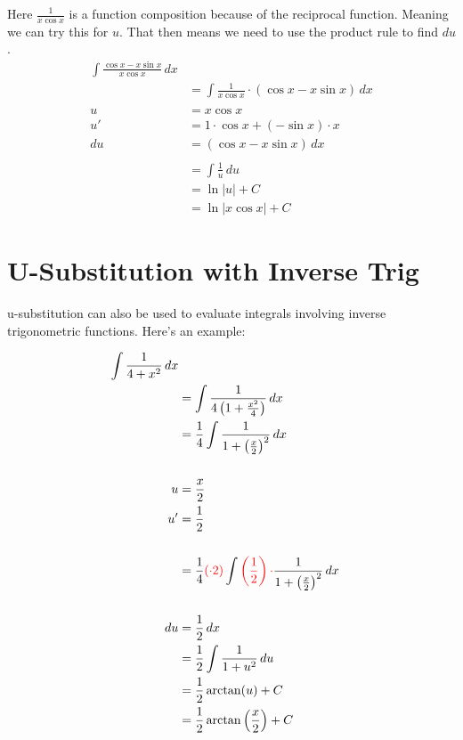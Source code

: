 \begin{framed}
  Here $\frac{1}{x \cos x}$ is a function composition because of
  the reciprocal function. Meaning we can try this for $u$. That then means
  we need to use the product rule to find $du$.
\begin{align*}
  \int \frac{\cos x - x \sin x}{x\cos x} \, dx\\
  &= \int \frac{1}{x\cos x} \cdot \left(\cos x - x\sin x\right) \, dx\\\\
  u &= x\cos x\\
  u' &= 1 \cdot \cos x + (- \sin x) \cdot x\\
  du &= \left(\cos x - x \sin x\right) \, dx\\\\
  &= \int \frac{1}{u} \, du\\
  &= \ln |u| + C\\
  &= \ln |x\cos x| + C
\end{align*}
\end{framed}


\newpage

\section{U-Substitution with Inverse Trig}
\noindent u-substitution can also be used to evaluate integrals involving 
inverse trigonometric functions. Here's an example:

\begin{framed}
  \begin{align*}
    \int \frac{1}{4+x^2} \, dx\\
    &= \int \frac{1}{4\left(1+\frac{x^2}{4}\right)} \, dx\\
    &= \frac{1}{4} \int \frac{1}{1 + \left(\frac{x}{2}\right)^2} \, dx\\\\
    u&=\frac{x}{2}\\
    u'&=\frac{1}{2}\\\\
    &= \frac{1}{4} \textcolor{red}{(\cdot 2)} \int 
    \textcolor{red}{\left(\frac{1}{2}\right) \cdot }\frac{1}{1 
    + \left(\frac{x}{2}\right)^2} \, dx\\\\
    du &= \frac{1}{2} \, dx\\
    &= \frac{1}{2} \int \frac{1}{1+u^2} \, du\\
    &= \frac{1}{2} \operatorname{arctan} (u) + C\\
    &= \frac{1}{2} \operatorname{arctan} \left(\frac{x}{2}\right) + C
    \end{align*}
\end{framed}

